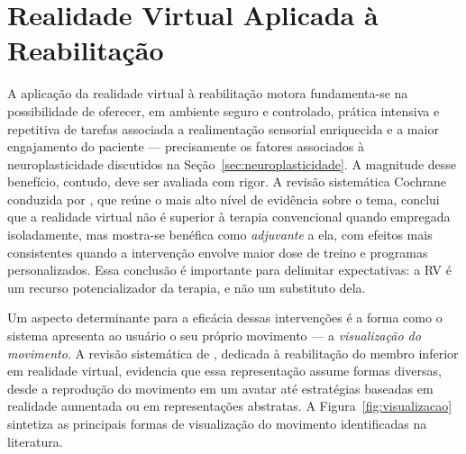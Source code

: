 \section{Realidade Virtual Aplicada à Reabilitação}
\label{sec:rv-reabilitacao}

A aplicação da realidade virtual à reabilitação motora fundamenta-se na possibilidade de
oferecer, em ambiente seguro e controlado, prática intensiva e repetitiva de tarefas
associada a realimentação sensorial enriquecida e a maior engajamento do paciente ---
precisamente os fatores associados à neuroplasticidade discutidos na
Seção~\ref{sec:neuroplasticidade}. A magnitude desse benefício, contudo, deve ser
avaliada com rigor. A revisão sistemática Cochrane conduzida por ,
que reúne o mais alto nível de evidência sobre o tema, conclui que a realidade virtual não
é superior à terapia convencional quando empregada isoladamente, mas mostra-se benéfica
como \emph{adjuvante} a ela, com efeitos mais consistentes quando a intervenção envolve
maior dose de treino e programas personalizados. Essa conclusão é importante para
delimitar expectativas: a RV é um recurso potencializador da terapia, e não um substituto
dela.

Um aspecto determinante para a eficácia dessas intervenções é a forma como o sistema
apresenta ao usuário o seu próprio movimento --- a \emph{visualização do movimento}. A
revisão sistemática de , dedicada à reabilitação do
membro inferior em realidade virtual, evidencia que essa representação assume formas
diversas, desde a reprodução do movimento em um avatar até estratégias baseadas em
realidade aumentada ou em representações abstratas. A Figura~\ref{fig:visualizacao}
sintetiza as principais formas de visualização do movimento identificadas na literatura.


